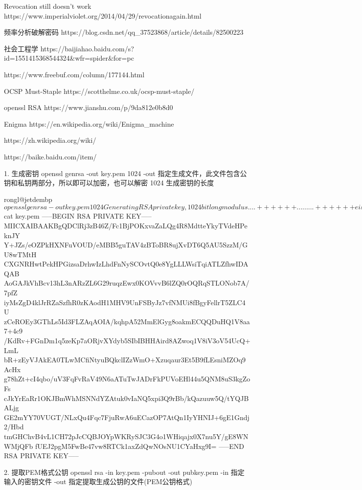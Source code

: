 
Revocation still doesn't work
https://www.imperialviolet.org/2014/04/29/revocationagain.html

频率分析破解密码
https://blog.csdn.net/qq_37523868/article/details/82500223

社会工程学
https://baijiahao.baidu.com/s?id=1551415368544324&wfr=spider&for=pc


https://www.freebuf.com/column/177144.html


OCSP Must-Staple
https://scotthelme.co.uk/ocsp-must-staple/


openssl RSA
https://www.jianshu.com/p/9da812e0b8d0

Enigma
https://en.wikipedia.org/wiki/Enigma_machine

https://zh.wikipedia.org/wiki/%

https://baike.baidu.com/item/%




1. 生成密钥
openssl genrsa -out key.pem 1024
    -out 指定生成文件，此文件包含公钥和私钥两部分，所以即可以加密，也可以解密
    1024 生成密钥的长度

    rongl@jetdembp ~ $ openssl genrsa -out key.pem 1024
    Generating RSA private key, 1024 bit long modulus
    ....++++++
    .........++++++
    e is 65537 (0x10001)
    rongl@jetdembp ~ $ cat key.pem
    -----BEGIN RSA PRIVATE KEY-----
    MIICXAIBAAKBgQDClRj3zB46Z/Fc1BjPOKxvaZaLQg4R8MdtteYkyTVdeHPeknJY
    Y+JZs/eOZPkHXNFuVOUD/eMBB5guTAV4zBToBR8ujXvDT6Q5AU5SzzM/GU8wTMtH
    CXGNRHwtPekHPGizsaDrhwIzLhdFnNySCOvtQ0e8YgLLLWsiTqiATLZfhwIDAQAB
    AoGAJkVhBcv13hL3nARzZL6G29ruqzEwx0KOVvvB6lZQ0rOQRqSTLONob7A/7pfZ
    iyMsZgD4klJrRZaSzfhR0zKAodH1MHV9UnFSByJz7vfNMUi8fBgyFellrT5ZLC4U
    zCeROEy3GThLs5Id3FLZAqAOIA/kqhpA52MmElGyg8oakmECQQDuHQ1V8aa7+4c9
    /KdRv+FGnDm1q5zeKp7aORjvXYdyb5SIbIBHHAird8AZwoq1V8iV3oV54UcQ+LmL
    bR+zEyVJAkEA0TLwMCfiNtyuBQkclIZzWmO+Xzuqaur3Et5B9fLEsniMZOq9AcHx
    g78hZt+cI4qbo/uV3FqFvRaV49N6aATuTwJADrFkPUVoEHl44u5QNM8uS3kgZoFs
    cJkYrEaRr1OKJBmWhMSNNdYZAtuk0vIaNQ5xpi3Q9rBb/kQazuuw5Q/tYQJBALjg
    GE2mYY70VUGT/NLxQu4Fqc7FjuRwA6uECazOP7AtQn1IyYHNIJ+6gE1Gndj2/Hbd
    tmGHChvB4vL1CH72pJcCQBJOYpWKRySJC3G4o1WHiqajx0X7nu5Y/gE8WNWMjQFb
    fUEJ2pgM5FwBe47vw8RTCk1axZdQwNOsNU1CYaHxg9I=
    -----END RSA PRIVATE KEY-----


2. 提取PEM格式公钥
openssl rsa -in key.pem -pubout -out pubkey.pem
    -in 指定输入的密钥文件
    -out 指定提取生成公钥的文件(PEM公钥格式)

